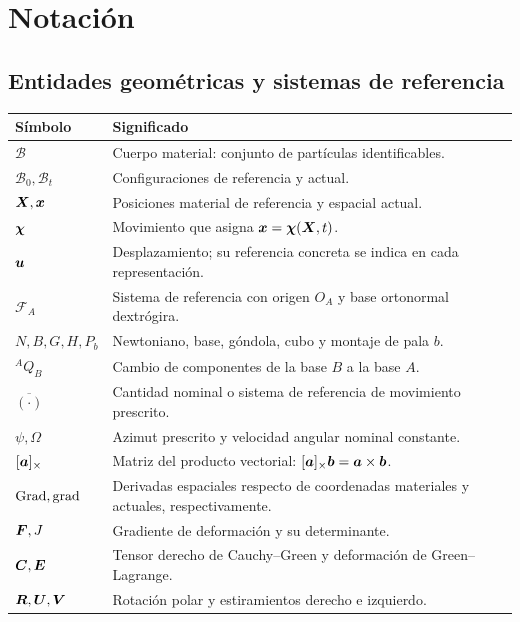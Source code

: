 \chapter{Notación}
\small
\section{Entidades geométricas y sistemas de referencia}
\begin{longtable}{p{}p{}}
\toprule Símbolo & Significado \\\midrule\endhead
$\mathcal B$ & Cuerpo material: conjunto de partículas identificables.\\
$\mathcal B_0,\mathcal B_t$ & Configuraciones de referencia y actual.\\
$\bm{X},\bm{x}$ & Posiciones material de referencia y espacial actual.\\
$\bm{\chi}$ & Movimiento que asigna $\bm{x}=\bm{\chi}(\bm{X},t)$.\\
$\bm{u}$ & Desplazamiento; su referencia concreta se indica en cada representación.\\
$\mathcal F_A$ & Sistema de referencia con origen $O_A$ y base ortonormal dextrógira.\\
$N,B,G,H,P_b$ & Newtoniano, base, góndola, cubo y montaje de pala $b$.\\
${}^AQ_B$ & Cambio de componentes de la base $B$ a la base $A$.\\
$\overline{(\cdot)}$ & Cantidad nominal o sistema de referencia de movimiento prescrito.\\
$\psi,\Omega$ & Azimut prescrito y velocidad angular nominal constante.\\
$[\bm{a}]_\times$ & Matriz del producto vectorial: $[\bm{a}]_\times\bm{b}=\bm{a}\times\bm{b}$.\\
$\operatorname{Grad},\operatorname{grad}$ & Derivadas espaciales respecto de coordenadas materiales y actuales, respectivamente.\\
$\boldsymbol{F},J$ & Gradiente de deformación y su determinante.\\
$\boldsymbol{C},\boldsymbol{E}$ & Tensor derecho de Cauchy--Green y deformación de Green--Lagrange.\\
$\boldsymbol{R},\boldsymbol{U},\boldsymbol{V}$ & Rotación polar y estiramientos derecho e izquierdo.\\
\bottomrule
\end{longtable}

